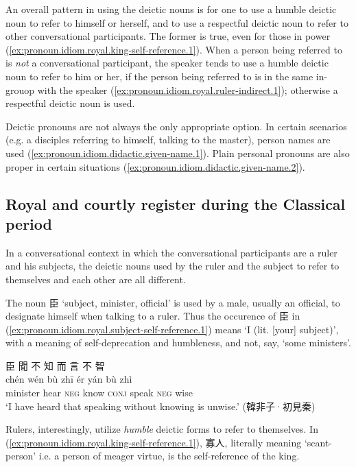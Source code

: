 \documentclass[UTF8, a4paper, oneside, scheme=plain, 12pt]{ctexrep}
\newcommand{\translate}[1]{`#1'}
\newcommand*{\category}[1]{\textsc{#1}}
\begin{document}
An overall pattern in using the deictic nouns is for one to use a humble deictic noun to refer to himself or herself, and to use a respectful deictic noun to refer to other conversational participants.
The former is true, even for those in power (\ref{ex:pronoun.idiom.royal.king-self-reference.1}).
When a person being referred to is \emph{not} a conversational participant,
the speaker tends to use a humble deictic noun to refer to him or her,
if the person being referred to is in the same in-grouop with the speaker (\ref{ex:pronoun.idiom.royal.ruler-indirect.1});
otherwise a respectful deictic noun is used.

Deictic pronouns are not always the only appropriate option.
In certain scenarios (e.g. a disciples referring to himself, talking to the master),
person names are used (\ref{ex:pronoun.idiom.didactic.given-name.1}).
Plain personal pronouns are also proper in certain situations (\ref{ex:pronoun.idiom.didactic.given-name.2}).

\subsection{Royal and courtly register during the Classical period}

In a conversational context in which the conversational participants are a ruler and his subjects, 
the deictic nouns used by the ruler and the subject to refer to themselves and each other are all different.

The noun 臣 \translate{subject, minister, official} is used by a male, usually an official, to designate himself when talking to a ruler.
Thus the occurence of 臣 in (\ref{ex:pronoun.idiom.royal.subject-self-reference.1})
means \translate{I (lit. [your] subject)},
with a meaning of self-deprecation and humbleness, and not, say, \translate{some ministers}.

\begin{exe}
    \ex\label{ex:pronoun.idiom.royal.subject-self-reference.1}
    \glll 臣 聞 不 知 而 言 不 智 \\
    chén wén bù zhī ér yán bù zhì \\
    minister hear \category{neg} know \category{conj} speak \category{neg} wise \\
    \glt\translate{I have heard that speaking without knowing is unwise.} \hfill (韓非子·初見秦)
\end{exe}

Rulers, interestingly, utilize \emph{humble} deictic forms to refer to themselves.
In (\ref{ex:pronoun.idiom.royal.king-self-reference.1}), 寡人, literally meaning \translate{scant-person} i.e. a person of meager virtue, is the self-reference of the king.
\end{document}
